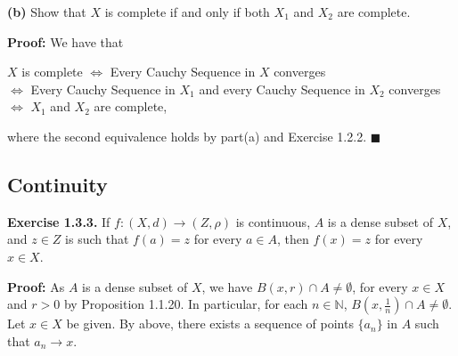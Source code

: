 \documentclass{article}
\begin{document}
\begin{tcolorbox}
\textbf{(b) }Show that $X$ is complete if and only if both $X_1$ and $X_2$ are complete.
\end{tcolorbox}
\textbf{Proof:} We have that 


$X$ is complete $\iff$ Every Cauchy Sequence in $X$ converges \\
$\iff$ Every Cauchy Sequence in $X_1$ and every Cauchy Sequence in $X_2$ converges \\
$\iff$ $X_1$ and $X_2$ are complete,

where the second equivalence holds by part(a) and Exercise 1.2.2. $\blacksquare$

\newpage

\subsection{ Continuity}
\begin{tcolorbox}
\textbf{Exercise 1.3.3.} If $f:(X,d)\to (Z,\rho)$ is continuous, $A$ is a dense subset of $X$, and $z\in Z$ is such that $f(a)=z$ for every $a\in A$, then $f(x)=z$ for every $x\in X$.
\end{tcolorbox}
\textbf{Proof:} As $A$ is a dense subset of $X$, we have $B(x,r)\cap A\neq \emptyset$, for every $x\in X$ and $r>0$ by Proposition 1.1.20. In particular, for each $n\in \mathbb{N}$, $B\left(x,\frac{1}{n}\right)\cap A\neq \emptyset$. Let $x\in X$ be given. By above, there exists a sequence of points $\{a_n\}$ in $A$ such that $a_n\to x$.
\end{document}
